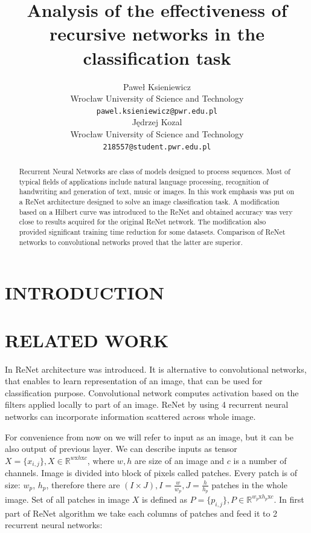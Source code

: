 \documentclass[a4paper, 10 pt, conference]{ieeeconf}
\title{\LARGE \bf
Analysis of the effectiveness of recursive
networks in the classification task
}
\author{\parbox{2 in}{\centering Paweł Ksieniewicz \\
        Wrocław University of Science and Technology\\
        {\tt\small pawel.ksieniewicz@pwr.edu.pl}}
        \hspace*{ 0.3 in}
        \parbox{2 in}{\centering Jędrzej Kozal \\
        Wrocław University of Science and Technology\\
        {\tt\small 218557@student.pwr.edu.pl}}
}
\begin{document}
\maketitle
\thispagestyle{empty}
\pagestyle{empty}

\begin{abstract}

Recurrent Neural Networks are class of models designed to process sequences. Most of typical fields of applications include natural language processing, recognition of handwriting and generation of text, music or images. In this work emphasis was put on a ReNet architecture designed to solve an image classification task. A modification based on a Hilbert curve was introduced to the ReNet and obtained accuracy was very close to results acquired for the original ReNet network. The modification also provided significant training time reduction for some datasets. Comparison of ReNet networks to convolutional networks proved that the latter are superior.

\end{abstract}


\section{INTRODUCTION}



 

\section{RELATED WORK}

In \cite{DBLP:journals/corr/VisinKCMCB15} ReNet architecture was introduced. It is alternative to convolutional networks, that enables to learn representation of an image, that can be used for classification purpose. Convolutional network computes activation based on the filters applied locally to part of an image. ReNet by using 4 recurrent neural networks can incorporate information scattered across whole image.

For convenience from now on we will refer to input as an image, but it can be also output of previous layer. We can describe inputs as tensor $X = \{x_{i,j}\}, X \in \mathbb{R}^{w \textrm{x} h \textrm{x} c}$, where $w, h$ are size of an image and $c$ is a number of channels. Image is divided into block of pixels called patches. Every patch is of size: $w_p$, $h_p$, therefore there are $(I \times J),I=\frac{w}{w_p}, J=\frac{h}{h_p}$ patches in the whole image. Set of all patches in image $X$ is defined as $P = \{p_{i,j}\}, P \in \mathbb{R}^{w_p \textrm{x} h_p \textrm{x} c}$. In first part of ReNet algorithm we take each columns of patches and feed it to 2 recurrent neural networks: 
\end{document}
